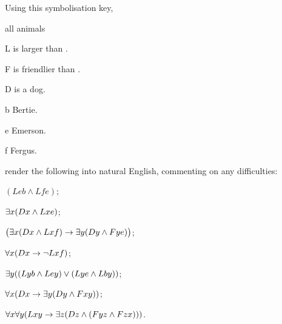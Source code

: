 \problempart
Using this symbolisation key, 
\begin{ekey}
	\item[\domain] all animals
	\item[L]  is larger than .
	\item[F]  is friendlier than .
	\item[D]  is a dog.
	\item[b] Bertie.
	\item[e] Emerson.
	\item[f] Fergus.
\end{ekey}
render the following into natural English, commenting on any difficulties:
\begin{earg}
	\item $(Leb \wedge Lfe)$;
	\item $\exists x (Dx \wedge Lxe)$;
	\item $\bigl(\exists x (Dx \wedge Lxf) \rightarrow \exists y (Dy \wedge Fye)\bigr)$;
	\item $\forall x (Dx \rightarrow \neg Lxf)$;
	\item $\exists y ((Lyb \wedge Ley) \vee (Lye \wedge Lby))$;
	\item $\forall x (Dx \rightarrow \exists y (Dy \wedge Fxy))$;
	\item $\forall x \forall y (Lxy \rightarrow \exists z (Dz \wedge (Fyz \wedge Fzx)))$.
\end{earg}

